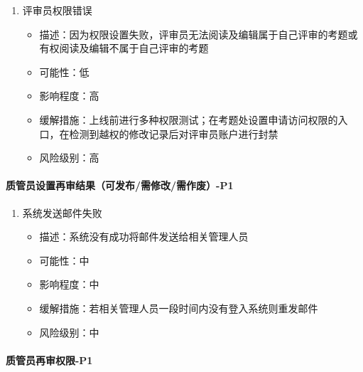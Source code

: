 \documentclass[hyperref, a4paper]{ctexart}
\providecommand{\tightlist}{%
  \setlength{\itemsep}{0pt}\setlength{\parskip}{0pt}}
\let\oldparagraph\paragraph
\renewcommand{\paragraph}[1]{\oldparagraph{#1}\mbox{}}
\begin{document}
\begin{enumerate}
\def\labelenumi{\arabic{enumi}.}
\tightlist
\item
  评审员权限错误

  \begin{itemize}
  \tightlist
  \item
    描述：因为权限设置失败，评审员无法阅读及编辑属于自己评审的考题或有权阅读及编辑不属于自己评审的考题
  \item
    可能性：低
  \item
    影响程度：高
  \item
    缓解措施：上线前进行多种权限测试；在考题处设置申请访问权限的入口，在检测到越权的修改记录后对评审员账户进行封禁
  \item
    风险级别：高
  \end{itemize}
\end{enumerate}

\hypertarget{ux8d28ux7ba1ux5458ux8bbeux7f6eux518dux5ba1ux7ed3ux679cux53efux53d1ux5e03ux9700ux4feeux6539ux9700ux4f5cux5e9f-p1}{%
\paragraph{质管员设置再审结果（可发布/需修改/需作废）-P1}\label{ux8d28ux7ba1ux5458ux8bbeux7f6eux518dux5ba1ux7ed3ux679cux53efux53d1ux5e03ux9700ux4feeux6539ux9700ux4f5cux5e9f-p1}}

\begin{enumerate}
\def\labelenumi{\arabic{enumi}.}
\tightlist
\item
  系统发送邮件失败

  \begin{itemize}
  \tightlist
  \item
    描述：系统没有成功将邮件发送给相关管理人员
  \item
    可能性：中
  \item
    影响程度：中
  \item
    缓解措施：若相关管理人员一段时间内没有登入系统则重发邮件
  \item
    风险级别：中
  \end{itemize}
\end{enumerate}

\hypertarget{ux8d28ux7ba1ux5458ux518dux5ba1ux6743ux9650-p1}{%
\paragraph{质管员再审权限-P1}\label{ux8d28ux7ba1ux5458ux518dux5ba1ux6743ux9650-p1}}
\end{document}
